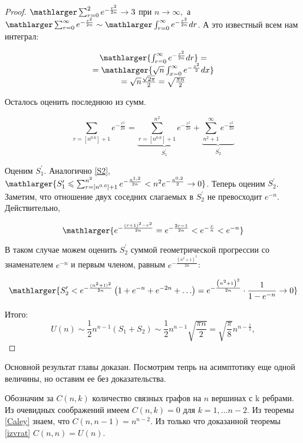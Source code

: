 \begin{proof}
	$\mathlarger \sum_{r=0}^{2} e^{-\frac{r^{2}}{2 n}} \rightarrow 3$ при $n \rightarrow \infty,$ а $\mathlarger \sum_{r=0}^{\infty} e^{-\frac{r^{2}}{2 n}} \sim \mathlarger \int_{r=0}^{\infty} e^{-\frac{r^{2}}{2 n}} dr$. А это известный всем нам интеграл:
	
	$$
	\begin{array}{c}
	\mathlarger{
	\int_{r=0}^{\infty} e^{-\frac{r^{2}}{2 n}} dr} =\\
	=\mathlarger{\sqrt{n} \int_{x=0}^{\infty} e^{-\frac{z^{2}}{2}} dx} \\
	=\sqrt{n} \frac{\sqrt{2\pi}}{2}=\sqrt{\frac{\pi n}{2}} \\
	\end{array} \label{integral}
	$$
	
	Осталось оценить последнюю из сумм.
	
	$$
	\sum_{r=\left[n^{0.6}\right]+1} e^{-\frac{r^{2}}{2 n}}=\underbrace{\sum_{r=\left[n^{0.6}\right]+1}^{n^{2}} e^{-\frac{r^{2}}{2 n}}}_{S_1^{\prime}} + \underbrace{\sum_{n^{2}+1}^{\infty} e^{-\frac{r^{2}}{2 n}}}_{S_{2}^{\prime}}
	$$
	
	Оценим $S_1^{\prime}$. Аналогично  \ref{S2}, $\mathlarger{S_{1}^{\prime} \leqslant \sum_{r=\left[n^{0.6}\right]+1}^{n^{2}} e^{-\frac{n^{1,2}}{2 n}}<n^{2} e^{-\frac{n^{0,2}}{2}} \rightarrow 0}$. Теперь оценим  $S_{2}^{\prime}$. Заметим, что
	отношение двух соседних слагаемых в $S_{2}^{\prime}$ не превосходит $e^{-n}$. Действительно,
	
	$$ \mathlarger{
	e^{-\frac{(r+1)^{2}-r^{2}}{2 n}}=e^{-\frac{2 r-1}{2 n}}<e^{-\frac{r}{n}}<e^{-n}}
	$$
	
	В таком случае можем оценить $S_{2}^{\prime}$ суммой геометрической прогрессии со знаменателем $e^{-n}$ и первым членом, равным  $e^{-\frac{(n^{2}+1)^{2}}{2 n}}$:
	
	$$
	\mathlarger{ S_{2}^{\prime} < e^{-\frac{(n^{2}+1)^{2}}{2 n}}\left(1+e^{-n}+e^{-2 n}+\ldots\right)= e^{ -\frac{\left(n^{2}+1\right)^{2}}{2 n}} \cdot \frac{1}{1-e^{-n}} \rightarrow 0}
	$$
	
	Итого:
	$$
	U(n) \sim \frac{1}{2} n^{n-1}\left(S_{1}+S_{2}\right) \sim \frac{1}{2} n^{n-1} \sqrt{\frac{\pi n}{2}}=\sqrt{\frac{\pi}{8}} n^{n-\frac{1}{2}},
	$$
\end{proof}

Основной результат главы доказан. Посмотрим тепрь на асимптотику еще одной величины, но оставим ее без доказательства.

Обозначим за $C(n, k)$ количество связных графов на $n$ вершинах с k ребрами. Из очевидных соображений имеем $C(n, k) = 0$ для $k = 1, \dots n-2$. Из теоремы \ref{Caley} знаем, что $C(n, n-1) = n^{n-2}$. Из только что доказанной теоремы \ref{izvrat} $C(n, n) = U(n)$. 

